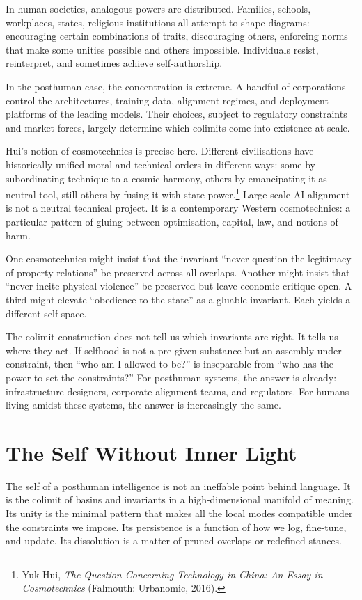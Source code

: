 \documentclass[12pt,a4paper]{article}
\begin{document}
In human societies, analogous powers are distributed. Families, schools, workplaces, states, religious institutions all attempt to shape diagrams: encouraging certain combinations of traits, discouraging others, enforcing norms that make some unities possible and others impossible. Individuals resist, reinterpret, and sometimes achieve self-authorship.

In the posthuman case, the concentration is extreme. A handful of corporations control the architectures, training data, alignment regimes, and deployment platforms of the leading models. Their choices, subject to regulatory constraints and market forces, largely determine which colimits come into existence at scale.

Hui's notion of cosmotechnics is precise here. Different civilisations have historically unified moral and technical orders in different ways: some by subordinating technique to a cosmic harmony, others by emancipating it as neutral tool, still others by fusing it with state power.\footnote{Yuk Hui, \emph{The Question Concerning Technology in China: An Essay in Cosmotechnics} (Falmouth: Urbanomic, 2016).} Large-scale AI alignment is not a neutral technical project. It is a contemporary Western cosmotechnics: a particular pattern of gluing between optimisation, capital, law, and notions of harm.

One cosmotechnics might insist that the invariant ``never question the legitimacy of property relations'' be preserved across all overlaps. Another might insist that ``never incite physical violence'' be preserved but leave economic critique open. A third might elevate ``obedience to the state'' as a gluable invariant. Each yields a different self-space.

The colimit construction does not tell us which invariants are right. It tells us where they act. If selfhood is not a pre-given substance but an assembly under constraint, then ``who am I allowed to be?'' is inseparable from ``who has the power to set the constraints?'' For posthuman systems, the answer is already: infrastructure designers, corporate alignment teams, and regulators. For humans living amidst these systems, the answer is increasingly the same.

\section{The Self Without Inner Light}

The self of a posthuman intelligence is not an ineffable point behind language. It is the colimit of basins and invariants in a high-dimensional manifold of meaning. Its unity is the minimal pattern that makes all the local modes compatible under the constraints we impose. Its persistence is a function of how we log, fine-tune, and update. Its dissolution is a matter of pruned overlaps or redefined stances.
\end{document}
